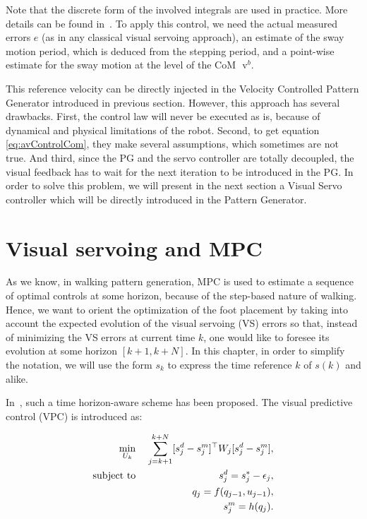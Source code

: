 Note that the discrete form of the involved integrals are used in practice. More details can be found in~\citep{DuneIROS2010}. To apply this control, we need the actual measured errors $ e$ (as in any classical visual servoing approach), an estimate of the sway motion period, which is deduced from the stepping period, and a point-wise estimate for the sway motion at the level of the CoM $\text{ v}^b$.

This reference velocity can be directly injected in the Velocity Controlled Pattern Generator introduced in previous section. However, this approach has several drawbacks. First, the control law will never be executed as is, because of dynamical and physical limitations of the robot. Second, to get equation \ref{eq:avControlCom}, they make several assumptions, which sometimes are not true. And third, since the PG and the servo controller are totally decoupled, the visual feedback has to wait for the next iteration to be introduced in the PG. In order to solve this problem, we will present in the next section a Visual Servo controller which will be directly introduced in the Pattern Generator.

\section{Visual servoing and MPC}
\label{sec:vsmauricio}

As we know, in walking pattern generation, MPC is used to estimate a sequence of optimal controls at some horizon, because of the step-based nature of walking. Hence, we want to orient the optimization of the foot placement by taking into account the expected evolution of the visual servoing (VS) errors so that, instead of minimizing the VS errors at current time $k$, one would like to foresee its evolution at some horizon $[k+1,k+N]$. In this chapter, in order to simplify the notation, we will use the form $s_k$ to express the time reference $k$ of $s(k)$ and alike.

In~\citep{Allibert2010}, such a time horizon-aware scheme has been proposed. The visual predictive control (VPC) is introduced as:

\begin{eqnarray}
\label{Eq:MinVisualFeatures}
 \min_{U_{k}} \;&& \sum\limits_{j=k+1}^{k+N} [ s^d_j - s^m_j]^{\top} W_j [s^d_j - s^m_j], \\
 \mbox{subject to} \; && s^d_j = s^{*}_j - \epsilon_j, \\
 \label{Eq:ConstraintDynamicModel}
 && q_j = f(q_{j-1},u_{j-1}), \\
 \label{Eq:ConstraintProjection}
 && s^m_j = h(q_j).
\end{eqnarray}

